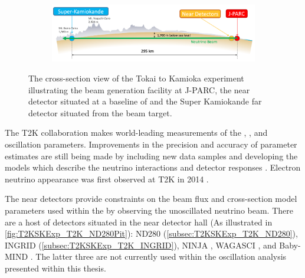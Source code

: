 \begin{figure}[h]
  \begin{subfigure}[t]{0.95\textwidth}
    \includegraphics[width=\textwidth, trim={0mm 0mm 0mm 0mm}, clip,page=1]{Figures/Detectors/T2KCrossSection.pdf}
  \end{subfigure}
  \caption{The cross-section view of the Tokai to Kamioka experiment illustrating the beam generation facility at J-PARC, the near detector situated at a baseline of  and the Super Kamiokande far detector situated  from the beam target.}
  \label{fig:T2KSKExp_T2K_Overview}
\end{figure}

The T2K collaboration makes world-leading measurements of the \sinsqatm, \delmsqatm, and \dcp oscillation parameters. Improvements in the precision and accuracy of parameter estimates are still being made by including new data samples and developing the models which describe the neutrino interactions and detector responses . Electron neutrino appearance was first observed at T2K in 2014 \cite{2014_Abe_ElectronNuApp}  .

The near detectors provide constraints on the beam flux and cross-section model parameters used within the   by observing the unoscillated neutrino beam. There are a host of detectors situated in the near detector hall (As illustrated in \autoref{fig:T2KSKExp_T2K_ND280Pit}): ND280 (\autoref{subsec:T2KSKExp_T2K_ND280}), INGRID (\autoref{subsec:T2KSKExp_T2K_INGRID}), NINJA \cite{ninja}, WAGASCI \cite{wagasci}, and Baby-MIND \cite{baby_mind}. The latter three are not currently used within the oscillation analysis presented within this thesis.

